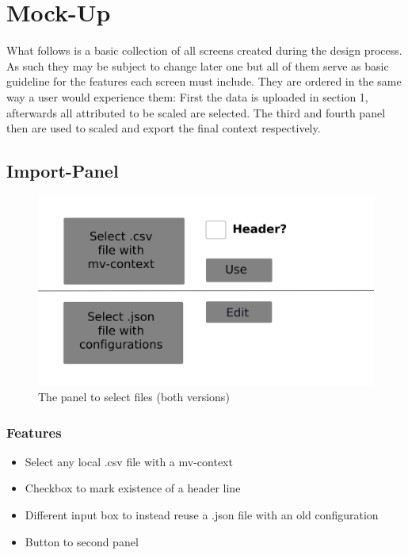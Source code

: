 \documentclass[]{report}
\begin{document}
\chapter{Mock-Up}
What follows is a basic collection of all screens created during the design process. As such they may be subject to change later one but all of them serve as basic guideline for the features each screen must include. They are ordered in the same way a user would experience them: First the data is uploaded in section 1, afterwards all attributed to be scaled are selected. The third and fourth panel then are used to scaled and export the final context respectively.

\section{Import-Panel}
\begin{figure}[H]
	\includegraphics[width=\linewidth]{mock_up/panel-1.png}
	\caption{The panel to select files (both versions)}
	\label{fig:p1}
\end{figure}

\subsection{Features}
\begin{itemize}
	\item Select any local .csv file with a mv-context
	\item Checkbox to mark existence of a header line
	\item Different input box to instead reuse a .json file with an old configuration
	\item Button to second panel
\end{itemize}

\newpage
\end{document}

